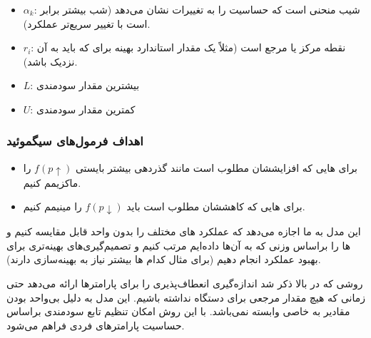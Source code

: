 
\begin{itemize}
    \item $\alpha_k$: شیب منحنی است که حساسیت را به تغییرات  نشان می‌دهد
    (شب بیشتر برابر است با تغییر سریع‌تر عملکرد).
    \item $r_i$: نقطه مرکز یا مرجع  است (مثلاً یک مقدار استاندارد بهینه
    برای  که  باید به آن نزدیک باشد).
    \item $L$: بیشترین مقدار سودمندی
    \item $U$: کمترین مقدار سودمندی
\end{itemize}

\subsubsection{اهداف فرمول‌های سیگموئید}

\begin{itemize}
    \item برای هایی که افزایششان مطلوب است مانند گذردهی بیشتر بایستی
    $f(p \uparrow)$ را ماکزیمم کنیم.
    \item برای هایی که کاهششان مطلوب است باید $f(p \downarrow)$ را
    مینیمم کنیم.
\end{itemize}

این مدل به ما اجازه می‌دهد که عملکرد های مختلف را بدون واحد قابل مقایسه
کنیم و ها را براساس وزنی که به آن‌ها داده‌ایم مرتب کنیم و تصمیم‌گیری‌های
بهینه‌تری برای بهبود عملکرد  انجام دهیم (برای مثال کدام ها بیشتر
نیاز به بهینه‌سازی دارند).

روشی که در بالا ذکر شد اندازه‌گیری انعطاف‌پذیری را برای پارامتر‌ها ارائه می‌دهد
حتی زمانی که هیچ مقدار مرجعی برای دستگاه  نداشته باشیم. این مدل به دلیل
بی‌واحد بودن مقادیر به  خاصی وابسته نمی‌باشد. با این روش امکان تنظیم
تابع سودمندی براساس حساسیت پارامتر‌های فردی فراهم می‌شود.